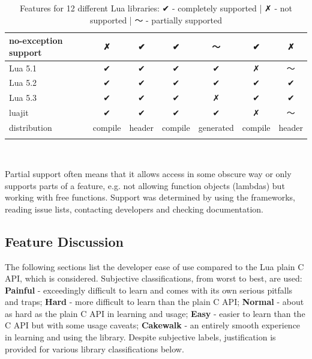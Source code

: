 \documentclass[conference,compsoc]{IEEEtran}
\begin{document}
\begin{table}[ht!]
\begin{tabular}{l c c c c c c }
		\\ \hline
		no-exception support      &        ✗       &     ✔    &     ✔    &     〜     &        ✔        &    ✗
		\\ \hline
		Lua 5.1                   &        ✔       &     ✔    &     ✔    &     ✔     &        ✗        &    〜
		\\ \hline
		Lua 5.2                   &        ✔       &     ✔    &     ✔    &     ✔     &        ✔        &    ✔
		\\ \hline
		Lua 5.3                   &        ✔       &     ✔    &     ✔    &     ✗     &        ✔        &    ✔
		\\ \hline
		luajit                    &        ✔       &     ✔    &     ✔    &     ✔     &        ✗        &    〜
		\\ \hline
		distribution              &     compile    &  header  &  compile & generated &     compile     & header
		\\ \hline \\
	\end{tabular}
	\\
	\caption{Features for 12 different Lua libraries: ✔ - completely supported | ✗ - not supported | 〜 - partially supported}
	Partial support often means that it allows access in some obscure way or only supports parts of a feature, e.g. not allowing function objects (lambdas) but working with free functions. Support was determined by using the frameworks, reading issue lists, contacting developers and checking documentation.
	\label{table:feature-table}
\end{table}

\subsection{Feature Discussion}

The following sections list the developer ease of use compared to the Lua plain C API, which is considered. Subjective classifications, from worst to best, are used: \textbf{Painful} - exceedingly difficult to learn and comes with its own serious pitfalls and traps; \textbf{Hard} - more difficult to learn than the plain C API; \textbf{Normal} - about as hard as the plain C API in learning and usage; \textbf{Easy} - easier to learn than the C API but with some usage caveats; \textbf{Cakewalk} - an entirely smooth experience in learning and using the library. Despite subjective labels, justification is provided for various library classifications below.
\end{document}
